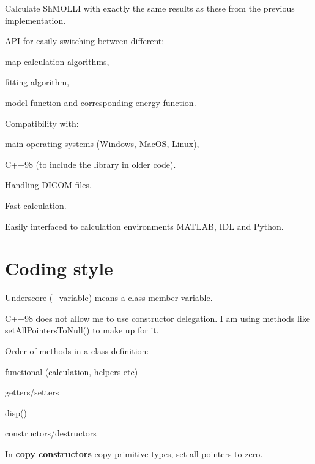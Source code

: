 \begin{DoxyEnumerate}
\item Calculate Sh\-M\-O\-L\-L\-I with exactly the same results as these from the previous implementation.
\item A\-P\-I for easily switching between different\-:
\begin{DoxyItemize}
\item map calculation algorithms,
\item fitting algorithm,
\item model function and corresponding energy function.
\end{DoxyItemize}
\item Compatibility with\-:
\begin{DoxyItemize}
\item main operating systems (Windows, Mac\-O\-S, Linux),
\item C++98 (to include the library in older code).
\end{DoxyItemize}
\item Handling D\-I\-C\-O\-M files.
\item Fast calculation.
\item Easily interfaced to calculation environments M\-A\-T\-L\-A\-B, I\-D\-L and Python.
\end{DoxyEnumerate}

\section*{Coding style}


\begin{DoxyItemize}
\item Underscore ({\ttfamily \-\_\-variable}) means a class member variable.
\item C++98 does not allow me to use constructor delegation. I am using methods like {\ttfamily set\-All\-Pointers\-To\-Null()} to make up for it.
\item Order of methods in a class definition\-:
\begin{DoxyItemize}
\item functional (calculation, helpers etc)
\item getters/setters
\item disp()
\item constructors/destructors
\end{DoxyItemize}
\item In {\bfseries copy constructors} copy primitive types, set all pointers to zero.
\end{DoxyItemize}

